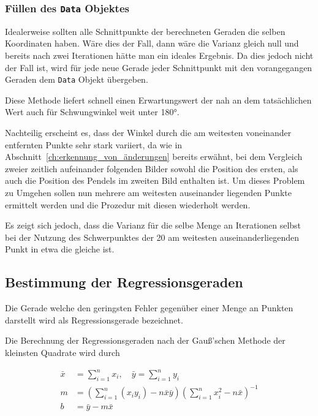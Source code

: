 \subsubsection{Füllen des \lstinline{Data} Objektes}

Idealerweise sollten alle Schnittpunkte der berechneten Geraden die selben Koordinaten haben.
Wäre dies der Fall, dann wäre die Varianz gleich null und bereits nach zwei Iterationen hätte man ein ideales Ergebnis.
Da dies jedoch nicht der Fall ist, wird für jede neue Gerade jeder Schnittpunkt mit den vorangegangen Geraden dem \lstinline{Data} Objekt übergeben.

Diese Methode liefert schnell einen Erwartungswert der nah an dem tatsächlichen Wert auch für Schwungwinkel weit unter 180°.

Nachteilig erscheint es, dass der Winkel durch die am weitesten voneinander entfernten Punkte sehr stark variiert, da wie in Abschnitt~\ref{ch:erkennung_von_änderungen} bereits erwähnt, bei dem Vergleich zweier zeitlich aufeinander folgenden Bilder sowohl die Position des ersten, als auch die Position des Pendels im zweiten Bild enthalten ist.
Um dieses Problem zu Umgehen sollen nun mehrere am weitesten auseinander liegenden Punkte ermittelt werden und die Prozedur mit diesen wiederholt werden.

Es zeigt sich jedoch, dass die Varianz für die selbe Menge an Iterationen selbst bei der Nutzung des Schwerpunktes der 20 am weitesten auseinanderliegenden Punkt in etwa die gleiche ist.


\subsection{Bestimmung der Regressionsgeraden}

Die Gerade welche den geringsten Fehler gegenüber einer Menge an Punkten darstellt wird als Regressionsgerade bezeichnet.

Die Berechnung der Regressionsgeraden nach der Gauß'schen Methode der kleinsten Quadrate wird durch %

\begin{equation}
    \begin{split}
        \bar{x} &= \sum_{i=1}^n x_i, \quad \bar{y} = \sum_{i=1}^n y_i \\
        m &= \left(\sum_{i=1}^n (x_i y_i) - n \bar{x} \bar{y}\right) \left(\sum_{i=1}^n x_i^2 - n \bar{x}\right)^{-1} \\
        b &= \bar{y} - m\bar{x}
    \end{split}
    \label{eq:regression_gauss}
\end{equation}


